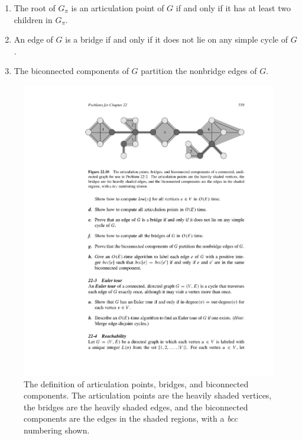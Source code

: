 \documentclass[12pt,a4paper]{article}
\theoremstyle{definition}
\begin{document}
\begin{enumerate}
    \begin{enumerate}
    	\item The root of $G_{\pi}$ is an articulation point of $G$ if and only if it has at least two children in $G_{\pi}$.
    	\item\label{2.(b)} An edge of $G$ is a bridge if and only if it does not lie on any simple cycle of $G$.
    	\item The biconnected components of $G$ partition the nonbridge edges of $G$.
    \end{enumerate}

	 \begin{figure}[htbp]
	 	
		\centering
		\includegraphics[width=6in]{Fig-Definition.pdf}
		\caption{The definition of articulation points, bridges, and biconnected components. The articulation points are the heavily shaded vertices, the bridges are the heavily shaded edges, and the biconnected components are the edges in the shaded regions, with a \textit{bcc} numbering shown.}
		\label{def}
	\end{figure}
	

\end{enumerate}
\end{document}
